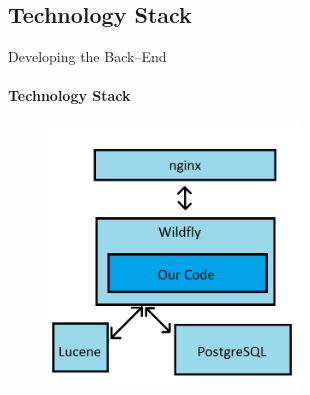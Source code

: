     \subsection{Technology Stack}
        \begin{frame}[t]{Developing the Back--End}\framesubtitle{Technology Stack}
             \begin{figure}[htb]
                \centering
                \includegraphics[width=0.6\textwidth]{dankarkitektur.png}
            \end{figure}
        \end{frame}
